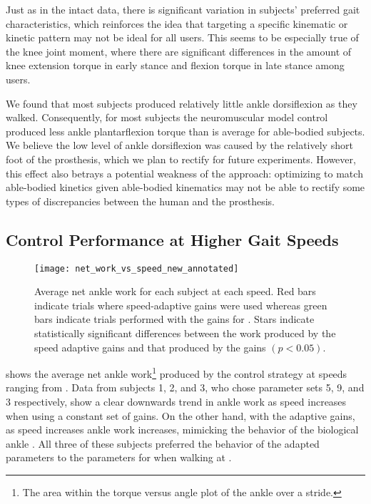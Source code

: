 Just as in the intact data, there is significant variation in subjects'
preferred gait characteristics, which reinforces the idea that targeting a
specific kinematic or kinetic pattern may not be ideal for all users. This seems
to be especially true of the knee joint moment, where there are significant
differences in the amount of knee extension torque in early stance and flexion
torque in late stance among users. 

We found that most subjects produced relatively little ankle dorsiflexion as
they walked. Consequently, for most subjects the neuromuscular model control
produced less ankle plantarflexion torque than is average for able-bodied
subjects.  We believe the low level of ankle dorsiflexion was caused by the
relatively short foot of the prosthesis, which we plan to rectify for future
experiments. However, this effect also betrays a potential weakness of the
approach: optimizing to match able-bodied kinetics given able-bodied kinematics
may not be able to rectify some types of discrepancies between the human and
the prosthesis.

\subsection{Control Performance at Higher Gait Speeds}
\begin{figure}
    \centering
    \texttt{[image: net\_work\_vs\_speed\_new\_annotated]}
    \caption{Average net ankle work for each subject at each speed. Red bars
    indicate trials where speed-adaptive gains were used whereas green bars
    indicate trials performed with the gains for . Stars
    indicate statistically significant differences between the work produced by
    the speed adaptive gains and that produced by the  gains
    $(p < 0.05)$.} \label{fig:net_work_vs_speed}
\end{figure}

 shows the average net ankle work\footnote{The area
within the torque versus angle plot of the ankle over a stride.} produced by the
control strategy at speeds ranging from . Data from
subjects 1, 2, and 3, who chose parameter sets 5, 9, and 3 respectively, show a
clear downwards trend in ankle work as speed increases when using a constant set
of gains. On the other hand, with the adaptive gains, as speed increases ankle
work increases, mimicking the behavior of the biological ankle
\citep{herr2012bionic}. All three of these subjects preferred the behavior of
the adapted parameters to the parameters for  when walking
at .

